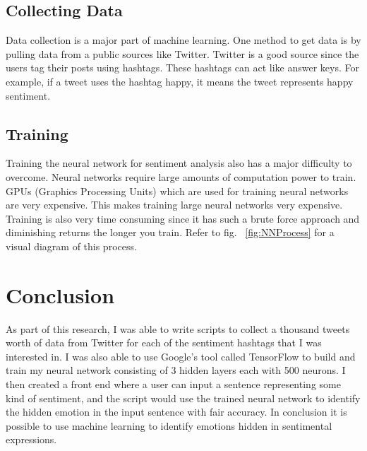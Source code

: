 \documentclass[12pt]{article}
\begin{document}
    \subsection{Collecting Data}
    Data collection is a major part of machine learning. One method to get data is by pulling data from a public sources like Twitter. Twitter is a good source since the users tag their posts using hashtags. These hashtags can act like answer keys. For example, if a tweet uses the hashtag happy, it means the tweet represents happy sentiment.

    \subsection{Training}
    Training the neural network for sentiment analysis also has a major difficulty to overcome. Neural networks require large amounts of computation power to train. GPUs (Graphics Processing Units) which are used for training neural networks are very expensive. This makes training large neural networks very expensive. Training is also very time consuming since it has such a brute force approach and diminishing returns the longer you train. Refer to fig. ~\ref{fig:NNProcess} for a visual diagram of this process.

    \section{Conclusion}
    As part of this research, I was able to write scripts to collect a thousand tweets worth of data from Twitter for each of the sentiment hashtags that I was interested in.  I was also able to use Google's tool called TensorFlow to build and train my neural network consisting of 3 hidden layers each with 500 neurons.  I then created a front end where a user can input a sentence representing some kind of sentiment, and the script would use the trained neural network to identify the hidden emotion in the input sentence with fair accuracy.  In conclusion it is possible to use machine learning to identify emotions hidden in sentimental expressions. 

    \printbibliography
\end{document}
